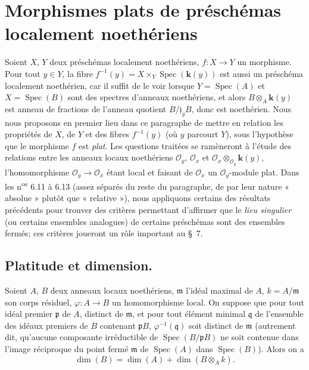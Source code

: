 \section{Morphismes plats de préschémas localement noethériens}

Soient $X$, $Y$ deux préschémas localement noethériens, $f:X\to Y$ un
morphisme. Pour tout $y\in Y$, la fibre
$f^{-1}(y)=X\times_Y\operatorname{Spec}(\boldsymbol{k}(y))$ est aussi un préschéma
localement noethérien, car il suffit de le voir lorsque
$Y=\operatorname{Spec}(A)$ et $X=\operatorname{Spec}(B)$ sont des spectres
d'anneaux noethériens, et alors $B\otimes_A \boldsymbol{k}(y)$ est anneau de fractions de
l'anneau quotient $B/\mathfrak j_yB$, donc est noethérien. Nous nous proposons
en premier lieu dans ce paragraphe de mettre en relation les propriétés de
$X$, de $Y$ et des fibres $f^{-1}(y)$ (où $y$ parcourt $Y$), sous l'hypothèse
que le morphisme $f$ est \emph{plat}. Les questions traitées se ramèneront à l'étude
des relations entre les anneaux locaux noethériens
$\mathcal O_y$, $\mathcal O_x$ et
$\mathcal O_x\otimes_{\mathcal O_y}\boldsymbol{k}(y)$, l'homomorphisme
$\mathcal O_y\to\mathcal O_x$ étant local et faisant de $\mathcal O_x$ un
$\mathcal O_y$-module plat. Dans les n\textsuperscript{os} 6.11 à 6.13 (assez
séparés du reste du paragraphe, de par leur nature « absolue » plutôt que
« relative »), nous appliquons certains des résultats précédents pour trouver
des
critères permettant d'affirmer que le \emph{lieu singulier} (ou certains
ensembles analogues) de certains préschémas sont des ensembles fermés; ces
critères joueront un rôle important au §~7.

\subsection{Platitude et dimension.}

\begin{proposition}[6.1.1]
\label{IV.2.s6.1.1-fr}
Soient $A$, $B$ deux anneaux locaux noethériens, $\mathfrak m$ l'idéal maximal
de $A$, $k=A/\mathfrak m$ son corps résiduel,
$\varphi:A\to B$ un homomorphisme local. On suppose que pour tout idéal
premier $\mathfrak p$ de $A$, distinct de $\mathfrak m$, et pour tout élément
minimal $\mathfrak q$ de l'ensemble des idéaux premiers de $B$ contenant
$\mathfrak pB$, $\varphi^{-1}(\mathfrak q)$ soit distinct de $\mathfrak m$
\textup{(autrement dit, qu'aucune composante irréductible de
$\operatorname{Spec}(B/\mathfrak pB)$ ne soit contenue dans l'image réciproque
du point fermé $\mathfrak m$ de $\operatorname{Spec}(A)$ dans
$\operatorname{Spec}(B)$)}. Alors on a
\begin{equation}
\dim(B)=\dim(A)+\dim(B\otimes_A k).
\tag{6.1.1.1}\label{IV.2.s6.1.1.1-fr}
\end{equation}
\end{proposition}

